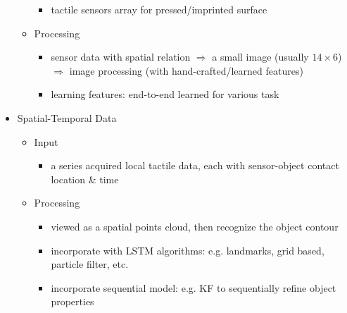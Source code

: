 \begin{itemize}
\begin{itemize}
\begin{itemize}
		\item tactile sensors array for pressed/imprinted surface
		\end{itemize}
	\item Processing
		\begin{itemize}
		\item sensor data with spatial relation $\Rightarrow$ a small image (usually $14\times6$) \\
		$\Rightarrow$ image processing (with hand-crafted/learned features)
		\item learning features: end-to-end learned for various task
		\end{itemize}
	\end{itemize}
\item Spatial-Temporal Data
	\begin{itemize}
	\item Input
		\begin{itemize}
		\item a series acquired local tactile data, each with sensor-object contact location \& time
		\end{itemize}
	\item Processing
		\begin{itemize}
		\item viewed as a spatial points cloud, then recognize the object contour
		\item incorporate with LSTM algorithms: e.g. landmarks, grid based, particle filter, etc.
		\item incorporate sequential model: e.g. KF to sequentially refine object properties
		\end{itemize}
	\end{itemize}
\end{itemize}
